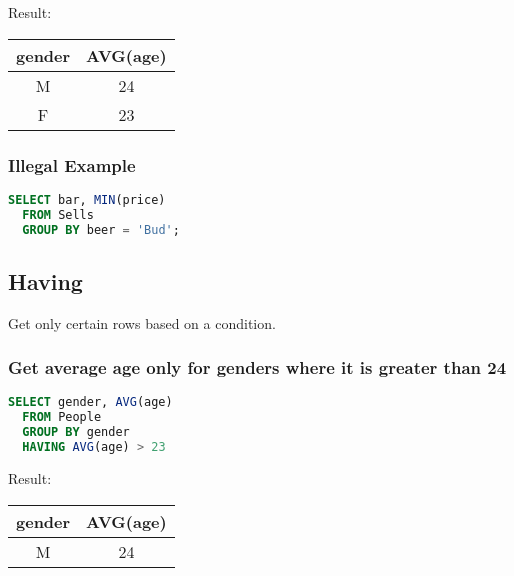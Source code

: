 \documentclass[12pt]{article}
\begin{document}
Result:
\begin{tabular}{|c|c|}
  \hline
  gender & AVG(age)\\ 
  \hline
  M & 24\\ 
  F & 23\\ 
  \hline
\end{tabular}

\subsubsection{Illegal Example}
\begin{lstlisting}[language=SQL]
  SELECT bar, MIN(price)
  FROM Sells
  GROUP BY beer = 'Bud';
\end{lstlisting}

\subsection{Having}
Get only certain rows based on a condition.
\subsubsection{Get average age only for genders where it is greater than 24}
\begin{lstlisting}[language=SQL]
  SELECT gender, AVG(age)
  FROM People
  GROUP BY gender
  HAVING AVG(age) > 23
\end{lstlisting}
Result:
\begin{tabular}{|c|c|}
  \hline
  gender & AVG(age)\\ 
  \hline
  M & 24\\ 
  \hline
\end{tabular}
\end{document}
